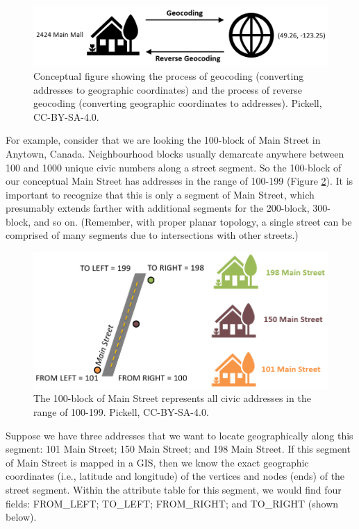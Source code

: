 \documentclass[
]{book}
\begin{document}
\begin{figure}
\includegraphics[width=0.75\linewidth]{images/07-geocoding} \caption{Conceptual figure showing the process of geocoding (converting addresses to geographic coordinates) and the process of reverse geocoding (converting geographic coordinates to addresses). Pickell, CC-BY-SA-4.0.}\label{fig:7-geocoding}
\end{figure}

For example, consider that we are looking the 100-block of Main Street in Anytown, Canada. Neighbourhood blocks usually demarcate anywhere between 100 and 1000 unique civic numbers along a street segment. So the 100-block of our conceptual Main Street has addresses in the range of 100-199 (Figure \ref{fig:7-left-right-side}). It is important to recognize that this is only a segment of Main Street, which presumably extends farther with additional segments for the 200-block, 300-block, and so on. (Remember, with proper planar topology, a single street can be comprised of many segments due to intersections with other streets.)

\begin{figure}
\includegraphics[width=0.75\linewidth]{images/07-left-right-side} \caption{The 100-block of Main Street represents all civic addresses in the range of 100-199. Pickell, CC-BY-SA-4.0.}\label{fig:7-left-right-side}
\end{figure}

Suppose we have three addresses that we want to locate geographically along this segment: 101 Main Street; 150 Main Street; and 198 Main Street. If this segment of Main Street is mapped in a GIS, then we know the exact geographic coordinates (i.e., latitude and longitude) of the vertices and nodes (ends) of the street segment. Within the attribute table for this segment, we would find four fields: FROM\_LEFT; TO\_LEFT; FROM\_RIGHT; and TO\_RIGHT (shown below).
\end{document}

